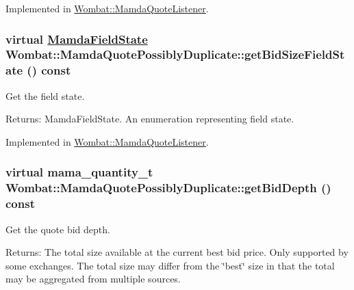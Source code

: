 Implemented in \hyperlink{classWombat_1_1MamdaQuoteListener_578f45a1ddaa18b8447cda08b943153e}{Wombat::Mamda\-Quote\-Listener}.\hypertarget{classWombat_1_1MamdaQuotePossiblyDuplicate_71ec701a3d28eda9f4fca37e44704e99}{
\subsubsection[getBidSizeFieldState]{\setlength{\rightskip}{0pt plus 5cm}virtual \hyperlink{namespaceWombat_93aac974f2ab713554fd12a1fa3b7d2a}{Mamda\-Field\-State} Wombat::Mamda\-Quote\-Possibly\-Duplicate::get\-Bid\-Size\-Field\-State () const}}
\label{classWombat_1_1MamdaQuotePossiblyDuplicate_71ec701a3d28eda9f4fca37e44704e99}


Get the field state. 

\begin{Desc}
\item[Returns:]Mamda\-Field\-State. An enumeration representing field state. \end{Desc}


Implemented in \hyperlink{classWombat_1_1MamdaQuoteListener_00ecbc2964d5439e77d04ffc2d00d9e9}{Wombat::Mamda\-Quote\-Listener}.\hypertarget{classWombat_1_1MamdaQuotePossiblyDuplicate_db64412a64c43f702ac5ad6537570775}{
\subsubsection[getBidDepth]{\setlength{\rightskip}{0pt plus 5cm}virtual mama\_\-quantity\_\-t Wombat::Mamda\-Quote\-Possibly\-Duplicate::get\-Bid\-Depth () const}}
\label{classWombat_1_1MamdaQuotePossiblyDuplicate_db64412a64c43f702ac5ad6537570775}


Get the quote bid depth. 

\begin{Desc}
\item[Returns:]The total size available at the current best bid price. Only supported by some exchanges. The total size may differ from the \char`\"{}best\char`\"{} size in that the total may be aggregated from multiple sources. \end{Desc}


